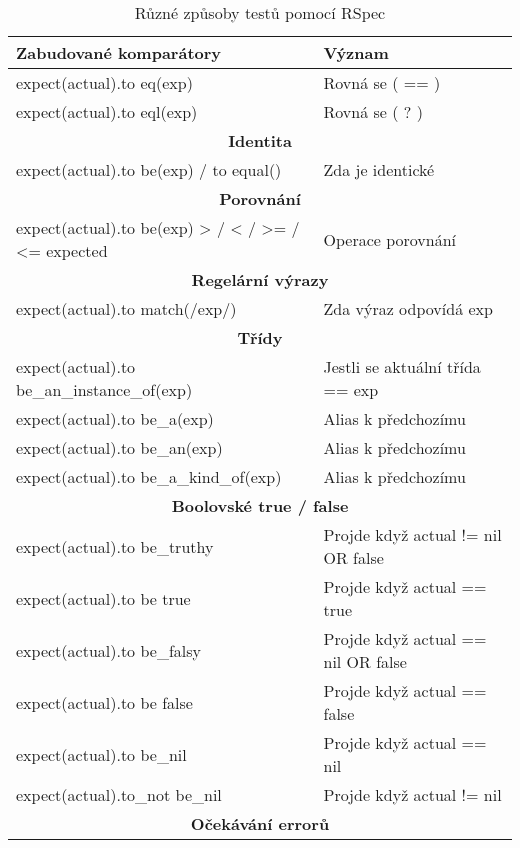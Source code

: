 \begin{center}
\begin{longtable}{| m{} | m{} |} 
\caption[RSpec metody testování]{Různé způsoby testů pomocí RSpec}\label{tab:rspec}\\
\hline
 \textbf{Zabudované komparátory} & \textbf{Význam} \\ 
 \hline
 expect(actual).to eq(exp) & Rovná se ( == ) \\
 \hline
 expect(actual).to eql(exp) & Rovná se ( ? ) \\
 \hline
 \multicolumn{2}{||c||}{\textbf{Identita}}\\
 \hline
 expect(actual).to be(exp) / to equal() & Zda je identické\\
 \hline
 \multicolumn{2}{||c||}{\textbf{Porovnání}}\\
 \hline
 expect(actual).to be(exp) > / < / >= / <= expected & Operace porovnání \\
 \hline
 \multicolumn{2}{||c||}{\textbf{Regelární výrazy}}\\
 \hline
 expect(actual).to match(/exp/) & Zda výraz odpovídá exp \\
 \hline
 \multicolumn{2}{||c||}{\textbf{Třídy}}\\
 \hline
 expect(actual).to be\_an\_instance\_of(exp) & Jestli se aktuální třída == exp \\
 \hline
 expect(actual).to be\_a(exp) & Alias k předchozímu \\
 \hline
 expect(actual).to be\_an(exp) & Alias k předchozímu  \\
 \hline
 expect(actual).to be\_a\_kind\_of(exp) & Alias k předchozímu  \\
 \hline
 \multicolumn{2}{||c||}{\textbf{Boolovské true / false}}\\
 \hline
 expect(actual).to be\_truthy  & Projde když actual != nil OR false\\
 \hline
 expect(actual).to be true    & Projde když actual == true \\
 \hline
 expect(actual).to be\_falsy   & Projde když actual == nil OR false \\
 \hline
 expect(actual).to be false   & Projde když actual == false \\
 \hline
 expect(actual).to be\_nil     & Projde když actual == nil \\
 \hline
 expect(actual).to\_not be\_nil & Projde když actual != nil \\
 \hline
 \multicolumn{2}{||c||}{\textbf{Očekávání errorů}}\\

\end{longtable}
\end{center}
